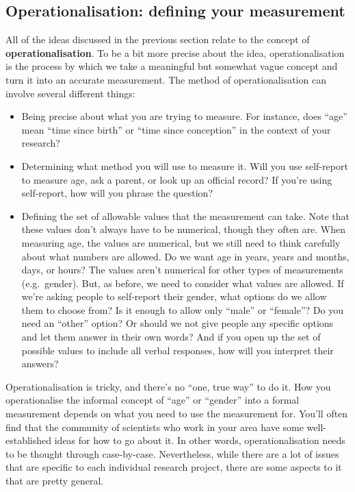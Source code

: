 \documentclass[
]{book}
\providecommand{\tightlist}{%
  \setlength{\itemsep}{0pt}\setlength{\parskip}{0pt}}
\theoremstyle{definition}
\theoremstyle{definition}
\theoremstyle{definition}
\theoremstyle{definition}
\theoremstyle{remark}
\begin{document}
\hypertarget{operationalisation-defining-your-measurement}{%
\subsection{Operationalisation: defining your measurement}\label{operationalisation-defining-your-measurement}}

All of the ideas discussed in the previous section relate to the concept of \textbf{operationalisation}. To be a bit more precise about the idea, operationalisation is the process by which we take a meaningful but somewhat vague concept and turn it into an accurate measurement. The method of operationalisation can involve several different things:

\begin{itemize}
\tightlist
\item
  Being precise about what you are trying to measure. For instance, does ``age'' mean ``time since birth'' or ``time since conception'' in the context of your research?
\item
  Determining what method you will use to measure it. Will you use self-report to measure age, ask a parent, or look up an official record? If you're using self-report, how will you phrase the question?
\item
  Defining the set of allowable values that the measurement can take. Note that these values don't always have to be numerical, though they often are. When measuring age, the values are numerical, but we still need to think carefully about what numbers are allowed. Do we want age in years, years and months, days, or hours? The values aren't numerical for other types of measurements (e.g.~gender). But, as before, we need to consider what values are allowed. If we're asking people to self-report their gender, what options do we allow them to choose from? Is it enough to allow only ``male'' or ``female''? Do you need an ``other'' option? Or should we not give people any specific options and let them answer in their own words? And if you open up the set of possible values to include all verbal responses, how will you interpret their answers?
\end{itemize}

Operationalisation is tricky, and there's no ``one, true way'' to do it. How you operationalise the informal concept of ``age'' or ``gender'' into a formal measurement depends on what you need to use the measurement for. You'll often find that the community of scientists who work in your area have some well-established ideas for how to go about it. In other words, operationalisation needs to be thought through case-by-case. Nevertheless, while there are a lot of issues that are specific to each individual research project, there are some aspects to it that are pretty general.
\end{document}
